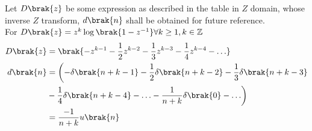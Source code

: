 Let $D\brak{z}$ be some expression as described in the table in $Z$ domain, whose inverse $Z$ transform, $d\brak{n}$ shall be obtained for future reference.\\
For $D\brak{z}= z^{k}\log\brak{1-z^{-1}} \forall k \geq 1, k\in \mathbb{Z}$
\begin{align}
	D\brak{z}&= \brak{-z^{k-1} - \frac{1}{2}z^{k-2} - \frac{1}{3}z^{k-3} - \frac{1}{4}z^{k-4} - \ldots}\\
	d\brak{n} &= \biggl(-\delta\brak{n+k-1}  -\frac{1}{2}\delta\brak{n+k-2}  -\frac{1}{3}\delta\brak{n+k-3} \notag \\ &-\frac{1}{4}\delta\brak{n+k-4} - \ldots - \frac{1}{n+k}\delta\brak{0}-\ldots\biggr)\\
	&= \frac{-1}{n+k} u\brak{n} \label{11027_eq_log}
\end{align}

